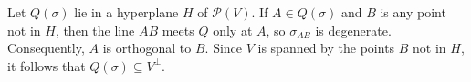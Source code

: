 Let $Q(\sigma)$ lie in a hyperplane $H$ of $\mathcal{P}(V)$. If $A \in Q(\sigma)$ and $B$ is any point not in $H$, then the line $AB$ meets $Q$ only at $A$, so $\sigma_{AB}$ is degenerate. Consequently, $A$ is orthogonal to $B$. Since $V$ is spanned by the points $B$ not in $H$, it follows that $Q(\sigma) \subseteq V^\perp$.
